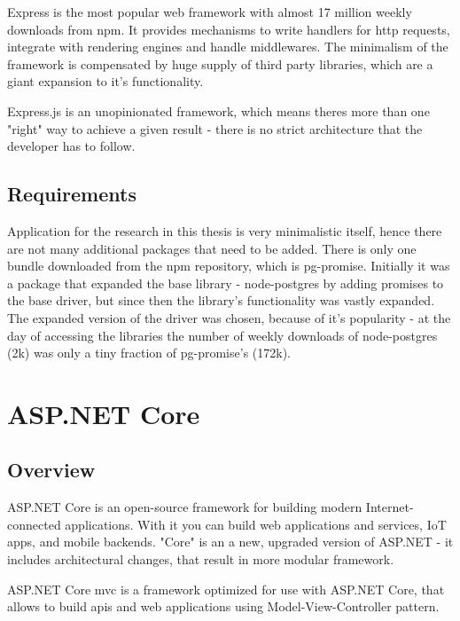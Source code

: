 Express is the most popular web framework with almost 17 million weekly downloads from \acrshort{npm}. It provides mechanisms to write handlers for \acrshort{http} requests, integrate with rendering engines and handle middlewares. The minimalism of the framework is compensated by huge supply of third party libraries, which are a giant expansion to it's functionality.

Express.js is an unopinionated framework, which means theres more than one "right" way to achieve a given result - there is no strict architecture that the developer has to follow.

\subsection{Requirements}
Application for the research in this thesis is very minimalistic itself, hence there are not many additional packages that need to be added. There is only one bundle downloaded from the \acrshort{npm} repository, which is pg-promise. Initially it was a package that expanded the base library - node-postgres by adding promises to the base driver, but since then the library's functionality was vastly expanded. %
The expanded version of the driver was chosen, because of it's popularity - at the day of accessing the libraries the number of weekly downloads of node-postgres (2k) was only a tiny fraction of pg-promise's (172k). %

\section{ASP.NET Core}

\subsection{Overview}
ASP.NET Core is an open-source framework for building modern Internet-connected applications. With it you can build web applications and services, IoT apps, and mobile backends. "Core" is an a new, upgraded version of ASP.NET - it includes architectural changes, that result in more modular framework. %

ASP.NET Core \acrshort{mvc} is a framework optimized for use with ASP.NET Core, that allows to build \acrshort{api}s and web applications using Model-View-Controller pattern. %


